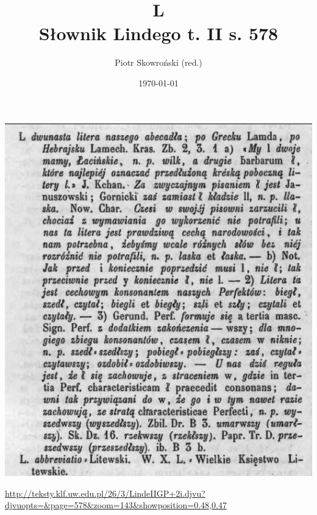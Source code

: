 \documentclass[12pt]{article}
\title{L\\
Słownik Lindego t. II s. 578}
\author{Piotr Skowroński (red.)}
\date{\today}
\begin{document}
\maketitle

\obeylines



\includegraphics{lindeL.png}

\bigskip
\url{http://teksty.klf.uw.edu.pl/26/3/LindeIIGP+2i.djvu?djvuopts=&page=578&zoom=143&showposition=0.48,0.47}


\newpage
\end{document}
